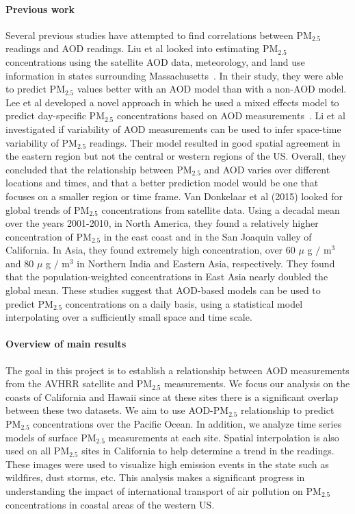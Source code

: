 \documentclass[10pt]{article}
\begin{document}
\paragraph{Previous work} Several previous studies have attempted to find
correlations between PM$_{2.5}$ readings and AOD readings. Liu et al  looked
into estimating PM$_{2.5}$ concentrations using the satellite AOD data,
meteorology, and land use information in states surrounding
Massachusetts~\cite{liu}. In their study, they were able to predict PM$_{2.5}$
values better with an AOD model than with a non-AOD model. Lee et al developed
a novel approach in which he used a mixed effects model to predict day-specific
PM$_{2.5}$ concentrations based on AOD measurements~\cite{lee}. Li et
al~\cite{li} investigated if variability of AOD measurements can be used to
infer space-time variability of PM$_{2.5}$ readings. Their model resulted in good
spatial agreement in the eastern region but not the central or western regions
of the US. Overall, they concluded that the relationship between PM$_{2.5}$ and AOD
varies over different locations and times, and that a better prediction model
would be one that focuses on a smaller region or time frame. Van Donkelaar et al (2015) looked for global trends of PM$_{2.5}$
concentrations from satellite data. Using a decadal mean over the years
2001-2010, in North America, they found a relatively higher concentration of PM$_{2.5}$
in the east coast and in the San Joaquin valley of California. In Asia, they
found extremely high concentration, over 60 $\mu$ g $/$ m$^3$ and 80 $\mu$ g
$/$ m$^3$ in Northern India and Eastern Asia, respectively. They found that the
population-weighted concentrations in East Asia nearly doubled the global mean.
These studies suggest that AOD-based models can be used to predict PM$_{2.5}$
concentrations on a daily basis, using a statistical model interpolating over a
sufficiently small space and time scale.

\paragraph{Overview of main results} The goal in this project is to establish a
relationship between AOD measurements from the AVHRR satellite and PM$_{2.5}$
measurements. We focus our analysis  on the coasts of California and Hawaii
since at these sites there is a significant overlap between these two datasets.
We aim to use AOD-PM$_{2.5}$ relationship to predict PM$_{2.5}$ concentrations
over the Pacific Ocean. In addition, we analyze time series models of surface
PM$_{2.5}$ measurements at each site. Spatial interpolation is also used on all
PM$_{2.5}$ sites in California to help determine a trend in the readings. These
images were used to visualize high emission events in the state such as
wildfires, dust storms, etc. This analysis makes a significant progress in 
understanding the impact of international transport of air pollution on
PM$_{2.5}$ concentrations in coastal areas of the western US.
\end{document}
